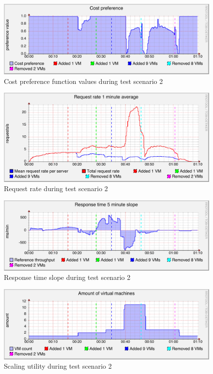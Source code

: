 \documentclass[english]{tktltiki2}
\theoremstyle{definition}
\theoremstyle{remark}
\begin{document}
\begin{figure}[htbp]
	\includegraphics[width=\textwidth]{images/costpreferencegraph-test23}
	\caption{Cost preference function values during test scenario 2}
	\label{fig:costPreferenceScenario2}
\end{figure}

\begin{figure}[htbp]
	\includegraphics[width=\textwidth]{images/requestrategraph-test23}
	\caption{Request rate during test scenario 2}
	\label{fig:requestRateScenario2}
\end{figure}

\begin{figure}[htbp]
	\includegraphics[width=\textwidth]{images/responsetimeslopegraph-test23}
	\caption{Response time slope during test scenario 2}
	\label{fig:responseTimeSlopeScenario2}
\end{figure}

\begin{figure}[htbp]
	\includegraphics[width=\textwidth]{images/vmcountgraph-test23}
	\caption{Scaling utility during test scenario 2}
	\label{fig:vmCountScenario2}
\end{figure}
\end{document}
